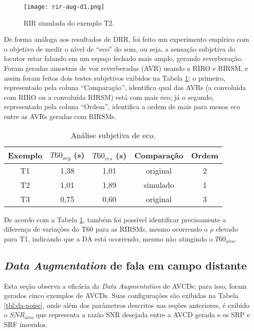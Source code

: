 \begin{figure} [H]
    \centering
    \texttt{[image: rir-aug-d1.png]}
    \caption{RIR simulada do exemplo T2.}
    \label{fig:rir-aug-t2}
\end{figure} 

De forma análoga aos resultados de DRR, foi feito um experimento empírico com o objetivo de medir o nível de “eco” do som, ou seja,
a sensação subjetiva do locutor estar falando em um espaço fechado mais amplo, gerando reverberação.
Foram geradas amostras de voz reverberadas (AVR) usando a RIRO e RIRSM, e assim foram feitos dois testes subjetivos exibidos na Tabela \ref{tbl:t60-exp}:
o primeiro, representado pela coluna “Comparação”, identifica qual das AVRs (a convoluída com RIRO ou a convoluída RIRSM) está com mais eco;
já o segundo, representado pela coluna “Ordem”, identifica a ordem de mais para menos eco entre as AVRs geradas com RIRSMs.

\begin{table} [H]
    \centering
    \caption{Análise subjetiva de eco.}
    \label{tbl:t60-exp}
    \begin{tabular}{c|c|c|c|c}

        \textbf{Exemplo} & 
        \textbf{$T60_{org}$ (s)} & 
        \textbf{$T60_{res}$ (s)} & 
        \textbf{Comparação} &
        \textbf{Ordem} \\
        \hline 

        T1 & 1,38 & 1,01 & original & 2 \\
        T2 & 1,01 & 1,89 & simulado & 1 \\
        T3 & 0,75 & 0,60 & original & 3 \\

    \end{tabular}
\end{table}

De acordo com a Tabela \ref{tbl:t60-exp}, também foi possível identificar precisamente a diferença de variações do T60 para as RIRSMs,
mesmo ocorrendo o $\rho$ elevado para T1, indicando que a DA está ocorrendo, mesmo não atingindo o $T60_{alvo}$.


\subsection{\textit{Data Augmentation} de fala em campo distante}

Esta seção observa a eficácia da \textit{Data Augmentation} de AVCDs; para isso, foram gerados cinco exemplos de AVCDs. Suas configurações
são exibidas na Tabela \ref{tbl:da-noise}, onde além dos parâmetros descritos nas seções anteriores, é exibido o $SNR_{alvo}$ que representa
a razão SNR desejada entre a AVCD gerada e os SRP e SRF inseridos.

